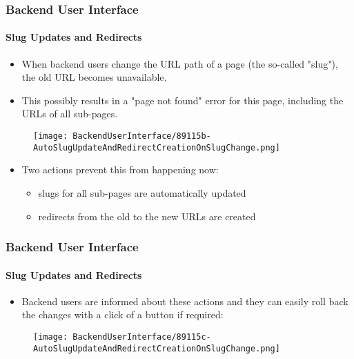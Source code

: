 
\begin{frame}[fragile]
	\frametitle{Backend User Interface}
	\framesubtitle{Slug Updates and Redirects}

	\begin{itemize}
		\item When backend users change the URL path of a page (the so-called "slug"),
			the old URL becomes unavailable.
		\item This possibly results in a "page not found" error for this page,
			including the URLs of all sub-pages.
	\end{itemize}

	\begin{figure}
		\texttt{[image: BackendUserInterface/89115b-AutoSlugUpdateAndRedirectCreationOnSlugChange.png]}
	\end{figure}

	\begin{itemize}
		\item Two actions prevent this from happening now:

			\begin{itemize}
				\item slugs for all sub-pages are automatically updated
				\item redirects from the old to the new URLs are created
			\end{itemize}

	\end{itemize}

\end{frame}


\begin{frame}[fragile]
	\frametitle{Backend User Interface}
	\framesubtitle{Slug Updates and Redirects}

	\begin{itemize}
		\item Backend users are informed about these actions and they can
			easily roll back the changes with a click of a button if required:
	\end{itemize}

	\begin{figure}
		\texttt{[image: BackendUserInterface/89115c-AutoSlugUpdateAndRedirectCreationOnSlugChange.png]}
	\end{figure}

\end{frame}

